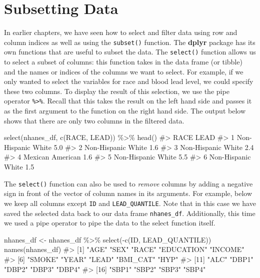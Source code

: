 \documentclass[
  letterpaper,
]{krantz}
\makeatletter
\newenvironment{Shaded}{\begin{snugshade}}{\end{snugshade}}
\newcommand{\CommentTok}[1]{\textcolor[rgb]{0.37,0.37,0.37}{#1}}
\newcommand{\FunctionTok}[1]{\textcolor[rgb]{0.28,0.35,0.67}{#1}}
\newcommand{\NormalTok}[1]{\textcolor[rgb]{0.00,0.23,0.31}{#1}}
\newcommand{\OtherTok}[1]{\textcolor[rgb]{0.00,0.23,0.31}{#1}}
\newcommand{\SpecialCharTok}[1]{\textcolor[rgb]{0.37,0.37,0.37}{#1}}
\newenvironment{kframe}{%
\medskip{}
\setlength{\fboxsep}{.8em}
 \def\at@end@of@kframe{}%
 \ifinner\ifhmode%
  \def\at@end@of@kframe{\end{minipage}}%
  \begin{minipage}{\columnwidth}%
 \fi\fi%
 \def\FrameCommand##1{\hskip\@totalleftmargin \hskip-\fboxsep
 \colorbox{shadecolor}{##1}\hskip-\fboxsep
     \hskip-\linewidth \hskip-\@totalleftmargin \hskip\columnwidth}%
 \MakeFramed {\advance\hsize-\width
   \@totalleftmargin\z@ \linewidth\hsize
   \@setminipage}}%
 {\par\unskip\endMakeFramed%
 \at@end@of@kframe}
\renewenvironment{Shaded}{\begin{kframe}}{\end{kframe}}
\makeatother
\begin{document}
\section{Subsetting Data}\label{subsetting-data}

In earlier chapters, we have seen how to select and filter data using
row and column indices as well as using the \texttt{subset()} function.
The \textbf{dplyr} package has its own functions that are useful to
subset the data. The \texttt{select()} function allows us to select a
subset of columns: this function takes in the data frame (or tibble) and
the names or indices of the columns we want to select. For example, if
we only wanted to select the variables for race and blood lead level, we
could specify these two columns. To display the result of this
selection, we use the pipe operator \texttt{\%\textgreater{}\%}. Recall
that this takes the result on the left hand side and passes it as the
first argument to the function on the right hand side. The output below
shows that there are only two columns in the filtered data.

\begin{Shaded}
\begin{Highlighting}[]
\FunctionTok{select}\NormalTok{(nhanes\_df, }\FunctionTok{c}\NormalTok{(RACE, LEAD)) }\SpecialCharTok{\%\textgreater{}\%} \FunctionTok{head}\NormalTok{()}
\CommentTok{\#\textgreater{}                 RACE LEAD}
\CommentTok{\#\textgreater{} 1 Non{-}Hispanic White  5.0}
\CommentTok{\#\textgreater{} 2 Non{-}Hispanic White  1.6}
\CommentTok{\#\textgreater{} 3 Non{-}Hispanic White  2.4}
\CommentTok{\#\textgreater{} 4   Mexican American  1.6}
\CommentTok{\#\textgreater{} 5 Non{-}Hispanic White  5.5}
\CommentTok{\#\textgreater{} 6 Non{-}Hispanic White  1.5}
\end{Highlighting}
\end{Shaded}

The \texttt{select()} function can also be used to \emph{remove} columns
by adding a negative sign in front of the vector of column names in its
arguments. For example, below we keep all columns except \texttt{ID} and
\texttt{LEAD\_QUANTILE}. Note that in this case we have saved the
selected data back to our data frame \texttt{nhanes\_df}. Additionally,
this time we used a pipe operator to pipe the data to the select
function itself.

\begin{Shaded}
\begin{Highlighting}[]
\NormalTok{nhanes\_df }\OtherTok{\textless{}{-}}\NormalTok{ nhanes\_df }\SpecialCharTok{\%\textgreater{}\%} \FunctionTok{select}\NormalTok{(}\SpecialCharTok{{-}}\FunctionTok{c}\NormalTok{(ID, LEAD\_QUANTILE))}
\FunctionTok{names}\NormalTok{(nhanes\_df)}
\CommentTok{\#\textgreater{}  [1] "AGE"       "SEX"       "RACE"      "EDUCATION" "INCOME"   }
\CommentTok{\#\textgreater{}  [6] "SMOKE"     "YEAR"      "LEAD"      "BMI\_CAT"   "HYP"      }
\CommentTok{\#\textgreater{} [11] "ALC"       "DBP1"      "DBP2"      "DBP3"      "DBP4"     }
\CommentTok{\#\textgreater{} [16] "SBP1"      "SBP2"      "SBP3"      "SBP4"}
\end{Highlighting}
\end{Shaded}
\end{document}
